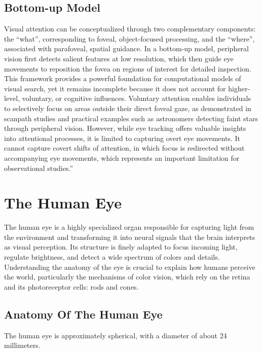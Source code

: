 \documentclass[12pt]{report}
\begin{document}
\subsection{Bottom-up Model}
Visual attention can be conceptualized through two complementary components: the “what”, corresponding to foveal, object-focused processing, and the “where”, associated with parafoveal, spatial guidance.
In a bottom-up model, peripheral vision first detects salient features at low resolution, which then guide eye movements to reposition the fovea on regions of interest for detailed inspection.
This framework provides a powerful foundation for computational models of visual search, yet it remains incomplete because it does not account for higher-level, voluntary, or cognitive influences.
Voluntary attention enables individuals to selectively focus on areas outside their direct foveal gaze, as demonstrated in scanpath studies and practical examples such as astronomers detecting faint stars through peripheral vision. 
However, while eye tracking offers valuable insights into attentional processes, it is limited to capturing overt eye movements. 
It cannot capture covert shifts of attention, in which focus is redirected without accompanying eye movements, which represents an important limitation for observational studies.”

\section{The Human Eye}

The human eye is a highly specialized organ responsible for capturing light from the environment and transforming it into neural signals that the brain interprets as visual perception.
Its structure is finely adapted to focus incoming light, regulate brightness, and detect a wide spectrum of colors and details.
Understanding the anatomy of the eye is crucial to explain how humans perceive the world, particularly the mechanisms of color vision, which rely on the retina and its photoreceptor cells: rods and cones.

\subsection{Anatomy Of The Human Eye}

The human eye is approximately spherical, with a diameter of about 24 millimeters. 
\end{document}
